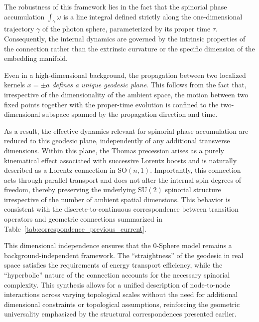 \documentclass[%
 reprint,
 amsmath,amssymb,
 aps,
 prb,
]{revtex4-2}
\numberwithin{equation}{section}
\begin{document}
The robustness of this framework lies in the fact that the spinorial phase accumulation $\int_{\gamma} \omega$ is a line integral defined strictly along the one-dimensional trajectory $\gamma$ of the photon sphere, parameterized by its proper time $\tau$. Consequently, the internal dynamics are governed by the intrinsic properties of the connection rather than the extrinsic curvature or the specific dimension of the embedding manifold.

Even in a high-dimensional background, the propagation between two localized kernels $x = \pm a$ \textit{defines a unique geodesic plane}. 
This follows from the fact that, irrespective of the dimensionality of the ambient space, the motion between two fixed points together with the proper-time evolution is confined to the two-dimensional subspace spanned by the propagation direction and time. 


As a result, the effective dynamics relevant for spinorial phase accumulation are reduced to this geodesic plane, independently of any additional transverse dimensions. Within this plane, the Thomas precession arises as a purely kinematical effect associated with successive Lorentz boosts and is naturally described as a Lorentz connection in $\mathrm{SO}(n,1)$. 
Importantly, this connection acts through parallel transport and does not alter the internal spin degrees of freedom, thereby preserving the underlying $\mathrm{SU}(2)$ spinorial structure irrespective of the number of ambient spatial dimensions. 
This behavior is consistent with the discrete-to-continuous correspondence between transition operators and geometric connections summarized in Table~\ref{tab:correspondence_previous_current}.


This dimensional independence ensures that the 0-Sphere model remains a background-independent framework. The ``straightness'' of the geodesic in real space satisfies the requirements of energy transport efficiency, while the ``hyperbolic'' nature of the connection accounts for the necessary spinorial complexity. This synthesis allows for a unified description of node-to-node interactions across varying topological scales without the need for additional dimensional constraints or topological assumptions, reinforcing the geometric universality emphasized by the structural correspondences presented earlier.
\end{document}
